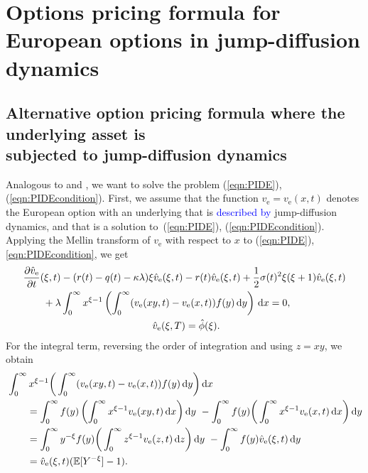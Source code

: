\chapter[Options pricing formula for European options in jump-diffusion dynamics]{Options pricing formula for European options in jump-diffusion dynamics}

\section{Alternative option pricing formula where the underlying asset is \\
subjected to jump-diffusion dynamics}
Analogous to \cite{Merton1976} and \cite{Frontczak2013}, we want to solve the problem (\ref{eqn:PIDE}), (\ref{eqn:PIDEcondition}). First, we assume that the function $v_\text{e} = v_\text{e}(x,t)$ denotes the European option with an underlying that is \textcolor{blue}{described by} jump-diffusion dynamics, and that is a solution to~(\ref{eqn:PIDE}), (\ref{eqn:PIDEcondition}). Applying the Mellin transform of $v_\text{e}$ with respect to $x$ to (\ref{eqn:PIDE}), \eqref{eqn:PIDEcondition}, we get
	\begin{align}
		\label{eqn:PIDEMellin}
		\begin{split}
		&\frac{\partial \hat v_\text{e}}{\partial t}(\xi,t) - (r(t) - q(t) - \kappa\lambda)\xi \hat v_\text{e}(\xi,t) -r(t)\hat v_\text{e}(\xi,t) + \frac{1}			{2}\sigma(t)^2\xi(\xi+1)\hat v_\text{e}(\xi,t) \\
		&\qquad + \lambda \int_0^\infty x^{\xi-1} \left( \int_0^\infty (v_\text{e}(xy,t) - v_\text{e}(x,t))f(y) \, \mathrm d y \right) \, \mathrm d x = 0, \\
		&\qquad \qquad \qquad \qquad \qquad \qquad \quad \hat v_\text{e}(\xi,T) = \hat \phi(\xi).
		\end{split}
	\end{align}
For the integral term, reversing the order of integration and using $z = xy$, we obtain
	\begin{align*}
		&\int_0^\infty x^{\xi-1} \bigg( \int_0^\infty (v_\text{e}(xy,t) - v_\text{e}(x,t))f(y) \, \mathrm d y \bigg) \, \mathrm d x \\
		&\qquad =\int_0^\infty f(y) \left( \int_0^\infty x^{\xi-1} v_\text{e}(xy,t) \, \mathrm d x \right) \mathrm d y \ - \int_0^\infty f(y) \bigg( \int_0^\infty x^{\xi-1}v_\text{e}(x,t) \, \mathrm d x \bigg) \, \mathrm d y \\
		&\qquad = \int_0^\infty y^{-\xi}f(y) \bigg( \int_0^\infty z^{\xi-1}v_\text{e}(z,t) \, \mathrm d z \bigg) \, \mathrm d y \ - \int_0^\infty f(y) \hat v_\text{e}(\xi,t) \, \mathrm d y \\
		&\qquad = \hat v_\text{e}(\xi,t) (\mathbb E[Y^{-\xi}]	 - 1).
	\end{align*}
